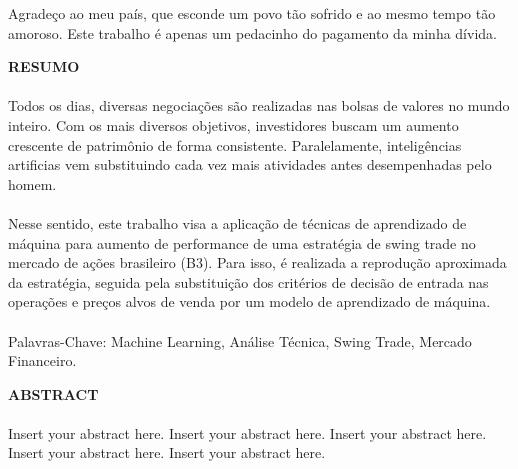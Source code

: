 
Agrade\c{c}o ao meu pa\'is, que esconde um povo t\~ao sofrido e ao mesmo tempo t\~ao amoroso. Este trabalho é apenas um pedacinho do pagamento da minha d\'ivida.


\pagebreak


\begin{center}
\textbf{RESUMO}
\end{center}
      \vspace{0.5cm}

\paragraph{} Todos os dias, diversas negociações são realizadas nas bolsas de valores no mundo inteiro. Com os mais diversos objetivos, investidores buscam um aumento crescente de patrimônio de forma consistente. Paralelamente, inteligências artificias vem substituindo cada vez mais atividades antes desempenhadas pelo homem.

\paragraph{} Nesse sentido, este trabalho visa a aplicação de técnicas de aprendizado de máquina para aumento de performance de uma estratégia de swing trade no mercado de ações brasileiro (B3). Para isso, é realizada a reprodução aproximada da estratégia, seguida pela substituição dos critérios de decisão de entrada nas operações e preços alvos de venda por um modelo de aprendizado de máquina.

\paragraph{}
\noindent Palavras-Chave: Machine Learning, Análise Técnica, Swing Trade, Mercado Financeiro.

\pagebreak


\begin{center}
\textbf{ABSTRACT}
\end{center}
      \vspace{0.5cm}

\paragraph{}Insert your abstract here. Insert your abstract here. Insert your abstract here. Insert your abstract here. Insert your abstract here.
